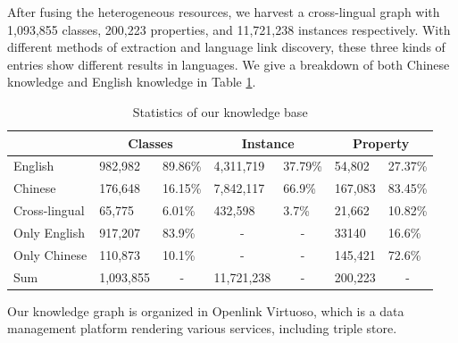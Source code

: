 \documentclass[runningheads,a4paper]{llncs}
\begin{document}
After fusing the heterogeneous resources, we harvest a cross-lingual graph with 1,093,855 classes, 200,223 properties, and 11,721,238 instances respectively. With different methods of extraction and language link discovery, these three kinds of entries show different results in languages. We give a breakdown of both Chinese knowledge and English knowledge in Table \ref{tab:kb-result}.

\begin{table}[h]
\small
\centering
\caption{Statistics of our knowledge base}
\label{tab:kb-result}
\begin{tabular}{|l|l|l|l|l|l|l|}
\hline
\multicolumn{1}{|c|}{} & \multicolumn{2}{c|}{Classes}      & \multicolumn{2}{c|}{Instance}                   & \multicolumn{2}{c|}{Property}    \\ \hline
English                & 982,982   & 89.86\%                & 4,311,719              & 37.79\%                & 54,802  & 27.37\%                \\ \hline
Chinese                & 176,648   & 16.15\%                & 7,842,117              & 66.9\%                 & 167,083 & 83.45\%                \\ \hline
Cross-lingual          & 65,775    & 6.01\%                 & 432,598                & 3.7\%                  & 21,662  & 10.82\%                \\ \hline
Only English           & 917,207   & 83.9\%                 & \multicolumn{1}{c|}{-} & \multicolumn{1}{c|}{-} & 33140   & 16.6\%                 \\ \hline
Only Chinese           & 110,873   & 10.1\%                 & \multicolumn{1}{c|}{-} & \multicolumn{1}{c|}{-} & 145,421 & 72.6\%                 \\ \hline
Sum                    & 1,093,855 & \multicolumn{1}{c|}{-} & 11,721,238             & \multicolumn{1}{c|}{-} & 200,223 & \multicolumn{1}{c|}{-} \\ \hline
\end{tabular}
\end{table}

Our knowledge graph is organized in Openlink Virtuoso, which is a data management platform rendering various services, including triple store.
\end{document}

